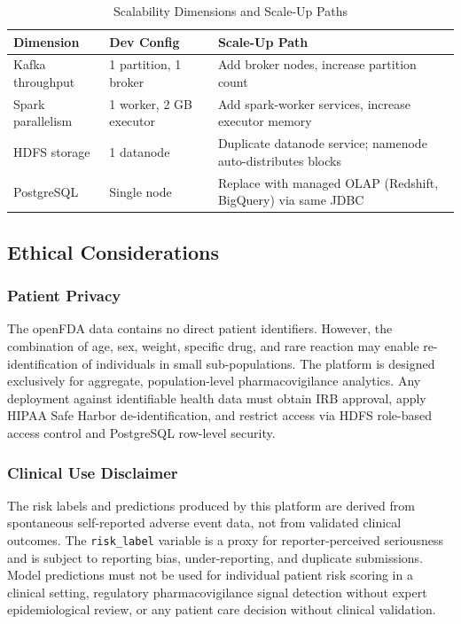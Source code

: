 \documentclass[conference]{IEEEtran}
\begin{document}
\begin{table}[htbp]
\caption{Scalability Dimensions and Scale-Up Paths}
\label{tab:scalability}
\centering
\begin{tabular}{p{1.6cm}p{2.0cm}p{3.2cm}}
\toprule
\textbf{Dimension} & \textbf{Dev Config} & \textbf{Scale-Up Path} \\
\midrule
Kafka throughput   & 1 partition, 1 broker & Add broker nodes, increase partition count \\
Spark parallelism  & 1 worker, 2 GB executor & Add spark-worker services, increase executor memory \\
HDFS storage       & 1 datanode & Duplicate datanode service; namenode auto-distributes blocks \\
PostgreSQL         & Single node & Replace with managed OLAP (Redshift, BigQuery) via same JDBC \\
\bottomrule
\end{tabular}
\end{table}

\subsection{Ethical Considerations}

\subsubsection{Patient Privacy}
The openFDA data contains no direct patient identifiers. However, the combination of age, sex, weight, specific drug, and rare reaction may enable re-identification of individuals in small sub-populations. The platform is designed exclusively for aggregate, population-level pharmacovigilance analytics. Any deployment against identifiable health data must obtain IRB approval, apply HIPAA Safe Harbor de-identification, and restrict access via HDFS role-based access control and PostgreSQL row-level security.

\subsubsection{Clinical Use Disclaimer}
The risk labels and predictions produced by this platform are derived from spontaneous self-reported adverse event data, not from validated clinical outcomes. The \texttt{risk\_label} variable is a proxy for reporter-perceived seriousness and is subject to reporting bias, under-reporting, and duplicate submissions. Model predictions must not be used for individual patient risk scoring in a clinical setting, regulatory pharmacovigilance signal detection without expert epidemiological review, or any patient care decision without clinical validation.
\end{document}
